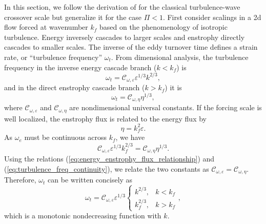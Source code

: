 \documentclass{jfm}
\begin{document}
In this section, we follow the derivation of \citet{Vallis1993} for
the classical turbulence-wave crossover scale but generalize it
for the case $\Pi<1$. First consider scalings in a 2d flow forced
at wavenumber $k_{f}$ based on the phenomenology of isotropic turbulence. 
Energy inversely cascades to larger scales and
enstrophy directly cascades to smaller scales. The inverse of the eddy
turnover time defines a strain rate, or ``turbulence frequency''
$\omega_{t}$. From dimensional analysis, the turbulence frequency in 
the inverse energy cascade branch ($k<k_f$) is
\begin{equation}
\omega_{t}=\mathcal{C}_{\omega,\varepsilon}\varepsilon^{1/3}k^{2/3},\label{eq:eddy_turnover_freq_inverse_cascade}
\end{equation}
and in the direct enstrophy cascade branch ($k>k_f$) it is
\begin{equation}
\omega_{t}=\mathcal{C}_{\omega,\eta}\eta^{1/3},\label{eq:eddy_turnover_freq_direct_enstrophy_cascade}
\end{equation}
where $\mathcal{C}_{\omega,\varepsilon}$ and $\mathcal{C}_{\omega,\eta}$
are nondimensional universal constants. If the forcing scale is 
well localized, the enstrophy flux is related to the energy flux by
\begin{equation}
\eta=k_{f}^{2}\varepsilon.\label{eq:energy_enstrophy_flux_relationship}
\end{equation}
As $\omega_{e}$ must be continuous across $k_{f}$, we have
\begin{equation}
\mathcal{C}_{\omega,\varepsilon}\varepsilon^{1/3}k_{f}^{2/3}=\mathcal{C}_{\omega,\eta}\eta^{1/3}.\label{eq:turbulence_freq_continuity}
\end{equation}
Using the relations (\ref{eq:energy_enstrophy_flux_relationship}) and (\ref{eq:turbulence_freq_continuity}),
we relate the two constants as $\mathcal{C}_{\omega,\varepsilon}=\mathcal{C}_{\omega,\eta}$.
Therefore, $\omega_{t}$ can be written concisely as
\begin{equation}
\omega_{t}=\mathcal{C}_{\omega,\varepsilon}\varepsilon^{1/3}\begin{cases}
k^{2/3}, & k<k_{f}\\
k_{f}^{2/3}, & k>k_{f}
\end{cases},\label{eq:eddy_turnover_freq_general_form}
\end{equation}
which is a monotonic nondecreasing function with $k$.
\end{document}
